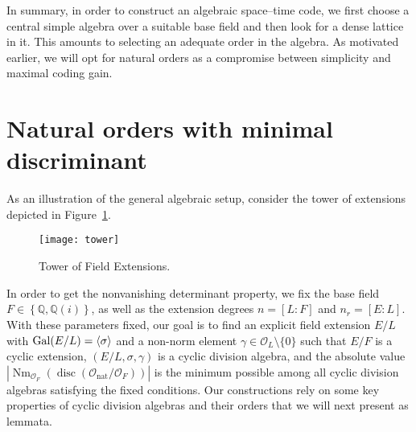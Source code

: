 \documentclass[smallextended]{svjour3}
\newcommand{\mcf}{\Or_{F}}
\newcommand{\mcl}{\Or_{L}}
\newcommand{\G}{{\rm Gal}}
\newcommand{\Or}{\mathcal{O}}
\DeclareMathOperator{\Nm}{Nm}
\DeclareMathOperator{\nat}{nat}
\DeclareMathOperator{\disc}{disc}
\DeclareMathOperator{\nr}{nr}
\DeclareMathOperator{\tr}{tr}
\begin{document}
In summary, in order to construct an algebraic space--time code, we first choose a central simple algebra over a suitable base field and then look for a dense lattice in it. This amounts to selecting an adequate order in the algebra. As motivated earlier, we will opt for natural orders as a compromise between simplicity and maximal coding gain. 



\section{Natural orders with minimal discriminant}
\label{sec:nat_orders}

As an illustration of the general algebraic setup, consider the tower of extensions depicted in Figure~\ref{fig:tower}. 
\begin{figure}[!h]
\centering
	\texttt{[image: tower]}
\caption{Tower of Field Extensions.}
\label{fig:tower}
\end{figure}
In order to get the nonvanishing determinant property, we fix the base field $F \in \left\{\mathbb{Q},\mathbb{Q}(i)\right\}$, as well as the extension degrees $n = [L:F]$ and $n_r = [E:L]$. With these parameters fixed, our goal is to find an explicit field extension $E/L$ with $\G(E/L) = \langle \sigma \rangle$ and a non-norm element $\gamma \in \mcl\setminus\{0\}$ such that $E/F$ is a cyclic extension, 
$(E/L,\sigma,\gamma)$ is a cyclic division algebra,
and the absolute value $|\Nm_{\Or_F}(\disc(\Or_{\nat}/\mcf))|$ is the minimum possible among all cyclic division algebras satisfying the fixed conditions. 
Our constructions rely on some key properties of cyclic division algebras and their orders that we will next present as lemmata. 

\end{document}
